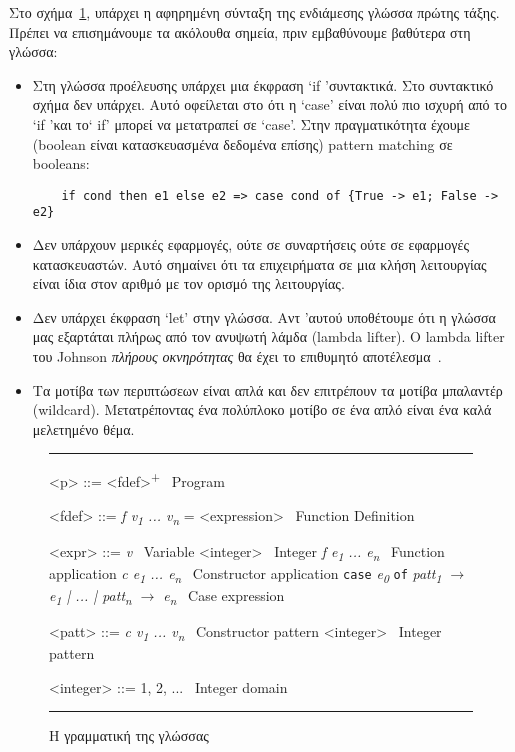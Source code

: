 \documentclass[diploma]{softlab-thesis}
\begin{document}
Στο σχήμα~\ref{fig:elgrammar}, υπάρχει η αφηρημένη σύνταξη της ενδιάμεσης γλώσσα πρώτης τάξης.
Πρέπει να επισημάνουμε τα ακόλουθα σημεία, πριν εμβαθύνουμε βαθύτερα στη γλώσσα:
\begin{itemize}
  \item Στη γλώσσα προέλευσης υπάρχει μια έκφραση `if 'συντακτικά. Στο συντακτικό σχήμα δεν υπάρχει.
Αυτό οφείλεται στο ότι η `case' είναι πολύ πιο ισχυρή από το `if 'και το` if' μπορεί να μετατραπεί 
σε `case'. Στην πραγματικότητα έχουμε (boolean είναι κατασκευασμένα δεδομένα επίσης) pattern matching 
σε booleans:
\begin{verbatim}
    if cond then e1 else e2 => case cond of {True -> e1; False -> e2}
\end{verbatim}
\item Δεν υπάρχουν μερικές εφαρμογές, ούτε σε συναρτήσεις ούτε σε εφαρμογές κατασκευαστών.
Αυτό σημαίνει ότι τα επιχειρήματα σε μια κλήση λειτουργίας είναι ίδια στον αριθμό με τον ορισμό 
της λειτουργίας.
\item Δεν υπάρχει έκφραση `let' στην γλώσσα. Αντ 'αυτού υποθέτουμε ότι η γλώσσα μας εξαρτάται 
πλήρως από τον ανυψωτή λάμδα (lambda lifter). O lambda lifter του Johnson 
\textit{πλήρους οκνηρότητας} θα έχει το επιθυμητό αποτέλεσμα~\cite{Johnsson:1985:LLT:5280.5292}.
\item Τα μοτίβα των περιπτώσεων είναι απλά και δεν επιτρέπουν τα μοτίβα μπαλαντέρ (wildcard). 
Μετατρέποντας ένα πολύπλοκο μοτίβο σε ένα απλό είναι ένα καλά μελετημένο θέμα.
\end{itemize}


\begin{figure}[t]
  \hrule
  \begin{grammar}
      <p> ::= <fdef>\textsuperscript{+} \hfill\ Program
  
      <fdef> ::= \textit{f v\textsubscript{1} ... v\textsubscript{n}} = <expression> \hfill\ Function Definition
  
      <expr> ::= \textit{v} \hfill\ Variable
      \alt <integer> \hfill\ Integer
      \alt \textit{f e\textsubscript{1} ... e\textsubscript{n}} \hfill\ Function application
      \alt \textit{c e\textsubscript{1} ... e\textsubscript{n}} \hfill\ Constructor application
      \alt \texttt{case} \textit{e\textsubscript{0}} \texttt{of} \textit{patt\textsubscript{1} $\rightarrow$ e\textsubscript{1} | ... | patt\textsubscript{n} $\rightarrow$ e\textsubscript{n}} \hfill\ Case expression
       
      <patt> ::= \textit{c v\textsubscript{1} ... v\textsubscript{n}} \hfill\ Constructor pattern
      \alt <integer> \hfill\ Integer pattern
  
      <integer> ::= 1, 2, ... \hfill\ Integer domain
  
  \end{grammar}
  \hrule
\caption{Η γραμματική της γλώσσας\label{fig:elgrammar}}
\end{figure}
\end{document}
